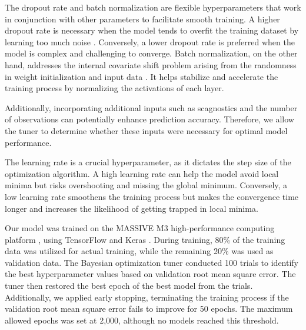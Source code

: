 \documentclass[]{interact}
\theoremstyle{plain}%
\theoremstyle{definition}
\theoremstyle{remark}
\begin{document}
The dropout rate and batch normalization are flexible hyperparameters
that work in conjunction with other parameters to facilitate smooth
training. A higher dropout rate is necessary when the model tends to
overfit the training dataset by learning too much noise
\citep{srivastava2014dropout}. Conversely, a lower dropout rate is
preferred when the model is complex and challenging to converge. Batch
normalization, on the other hand, addresses the internal covariate shift
problem arising from the randomness in weight initialization and input
data \citep{goodfellow2016deep}. It helps stabilize and accelerate the
training process by normalizing the activations of each layer.

Additionally, incorporating additional inputs such as scagnostics and
the number of observations can potentially enhance prediction accuracy.
Therefore, we allow the tuner to determine whether these inputs were
necessary for optimal model performance.

The learning rate is a crucial hyperparameter, as it dictates the step
size of the optimization algorithm. A high learning rate can help the
model avoid local minima but risks overshooting and missing the global
minimum. Conversely, a low learning rate smoothens the training process
but makes the convergence time longer and increases the likelihood of
getting trapped in local minima.

Our model was trained on the MASSIVE M3 high-performance computing
platform \citep{goscinski2014multi}, using TensorFlow
\citep{abadi2016tensorflow} and Keras \citep{chollet2015keras}. During
training, 80\% of the training data was utilized for actual training,
while the remaining 20\% was used as validation data. The Bayesian
optimization tuner conducted 100 trials to identify the best
hyperparameter values based on validation root mean square error. The
tuner then restored the best epoch of the best model from the trials.
Additionally, we applied early stopping, terminating the training
process if the validation root mean square error fails to improve for 50
epochs. The maximum allowed epochs was set at 2,000, although no models
reached this threshold.
\end{document}
